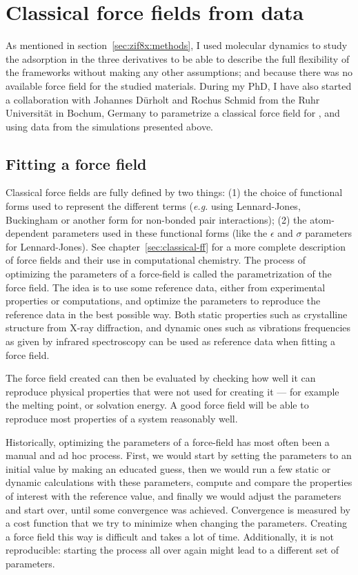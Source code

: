 \documentclass[thesis]{subfiles}
\begin{document}
\section{Classical force fields from \abinitio data}
\label{sec:classical-ff-parametrize}

As mentioned in section~\ref{sec:zif8x:methods}, I used \abinitio molecular
dynamics to study the adsorption in the three  derivatives to be able to
describe the full flexibility of the frameworks without making any other
assumptions; and because there was no available force field for the studied
materials. During my PhD, I have also started a collaboration with Johannes
Dürholt and Rochus Schmid from the Ruhr Universität in Bochum, Germany to
parametrize a classical force field for , \ZIFCl and \ZIFBr using data
from the \abinitio simulations presented above.

\subsection{Fitting a force field}

Classical force fields are fully defined by two things: (1) the choice of
functional forms used to represent the different terms (\emph{e.g.} using
Lennard-Jones, Buckingham or another form for non-bonded pair interactions); (2)
the atom-dependent parameters used in these functional forms (like the
$\epsilon$ and $\sigma$ parameters for Lennard-Jones). See
chapter~\ref{sec:classical-ff} for a more complete description of force fields
and their use in computational chemistry.  The process of optimizing the
parameters of a force-field is called the parametrization of the force field.
The idea is to use some reference data, either from experimental properties or
\abinitio computations, and optimize the parameters to reproduce the reference
data in the best possible way. Both static properties such as crystalline
structure from X-ray diffraction, and dynamic ones such as vibrations
frequencies as given by infrared spectroscopy can be used as reference data when
fitting a force field.

The force field created can then be evaluated by checking how well it can
reproduce physical properties that were not used for creating it --- for example
the melting point, or solvation energy. A good force field will be able to
reproduce most properties of a system reasonably well.

Historically, optimizing the parameters of a force-field has most often been a
manual and ad hoc process. First, we would start by setting the parameters to an
initial value by making an educated guess, then we would run a few static or
dynamic calculations with these parameters, compute and compare the properties
of interest with the reference value, and finally we would adjust the parameters
and start over, until some convergence was achieved. Convergence is measured by
a cost function that we try to minimize when changing the parameters. Creating a
force field this way is difficult and takes a lot of time. Additionally, it is
not reproducible: starting the process all over again might lead to a different
set of parameters.
\end{document}
